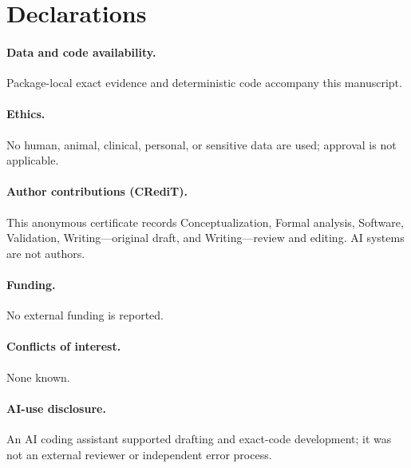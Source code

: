 \documentclass[10pt]{article}
\begin{document}
\section*{Declarations}
\paragraph{Data and code availability.} Package-local exact evidence and
deterministic code accompany this manuscript.
\paragraph{Ethics.} No human, animal, clinical, personal, or sensitive data
are used; approval is not applicable.
\paragraph{Author contributions (CRediT).} This anonymous certificate records
Conceptualization, Formal analysis, Software, Validation, Writing---original
draft, and Writing---review and editing. AI systems are not authors.
\paragraph{Funding.} No external funding is reported.
\paragraph{Conflicts of interest.} None known.
\paragraph{AI-use disclosure.} An AI coding assistant supported drafting and
exact-code development; it was not an external reviewer or independent error
process.
\end{document}

